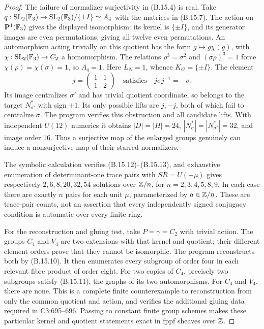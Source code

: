 \begin{proof}
The failure of normalizer surjectivity in (B.15.4) is real. Take
\(q:\operatorname{SL}_2(\mathbb F_3)\to\operatorname{SL}_2(\mathbb F_3)/\{\pm I\}\simeq A_4\)
with the matrices in (B.15.7). The action on
\(\mathbf P^1(\mathbb F_3)\) gives the displayed isomorphism: its
kernel is \(\{\pm I\}\), and its generator images are even
permutations, giving all twelve even permutations.
An automorphism acting trivially on this quotient has the form
\(g\mapsto g\chi(g)\), with \(\chi:\operatorname{SL}_2(\mathbb F_3)\to C_2\)
a homomorphism. The relations
\(\rho^3=\sigma^2\) and \((\sigma\rho)^3=1\) force
\(\chi(\rho)=\chi(\sigma)=1\), so \(A_q=1\).
Here \(L_N=1\), whence \(K_G=\{\pm I\}\). The element
\[
 j=\begin{pmatrix}1&1\\1&2\end{pmatrix}
 \quad\text{satisfies}\quad j\sigma j^{-1}=-\sigma.
\]
Its image centralizes \(\sigma'\) and has trivial quotient
coordinate, so belongs to the target \(N_{\sigma'}^*\) with
sign \(+1\). Its only possible lifts are \(j,-j\), both of
which fail to centralize \(\sigma\). The program verifies this
obstruction and all candidate lifts. With independent \(U(12)\)
numerics it obtains \(|D|=|H|=24\),
\(|N_\sigma^*|=|N_{\sigma'}^*|=32\), and image order \(16\).
Thus a surjective map of the enlarged groups genuinely can induce
a nonsurjective map of their starred normalizers.

The symbolic calculation verifies (B.15.12)--(B.15.13), and
exhaustive enumeration of determinant-one trace pairs with
\(SR=U(-\mu)\) gives respectively \(2,6,8,20,32,54\)
solutions over \(\mathbb Z/n\), for \(n=2,3,4,5,8,9\).
In each case there are exactly \(n\) pairs for each unit
\(\mu\), parameterized by \(a\in\mathbb Z/n\). These are trace-pair
counts, not an assertion that every independently signed
conjugacy condition is automatic over every finite ring.

For the reconstruction and gluing test, take \(P=\gamma=C_2\)
with trivial action. The groups \(C_4\) and \(V_4\) are two
extensions with that kernel and quotient; their different element
orders prove that they cannot be isomorphic. The program reconstructs
both by (B.15.10). It then enumerates every subgroup of order four
in each relevant fibre product of order eight. For two copies of
\(C_4\), precisely two subgroups satisfy (B.15.11), the graphs
of its two automorphisms. For \(C_4\) and \(V_4\), there are
none. This is a complete finite counterexample to reconstruction
from only the common quotient and action, and verifies the
additional gluing data required in C3:695--696. Passing to constant
finite group schemes makes these particular kernel and quotient
statements exact in fppf sheaves over \(\mathbb Z\).
\end{proof}

